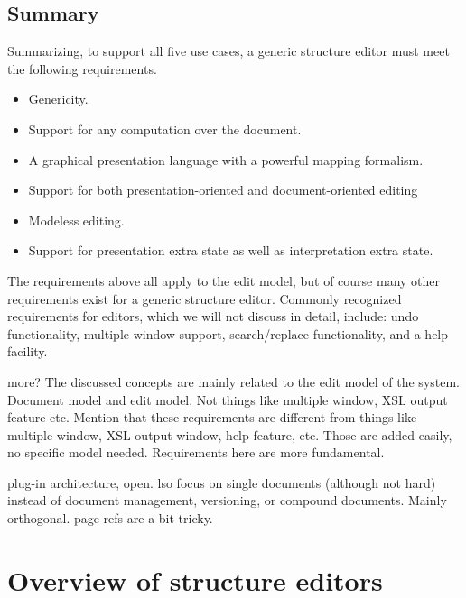 \documentclass{speauth}
\begin{document}
\subsection{Summary}

Summarizing, to support all five use cases, a generic structure editor must meet the following requirements.

\begin{itemize}
\item Genericity.
\item Support for any computation over the document.
\item A graphical presentation language with a powerful mapping formalism.
\item Support for both presentation-oriented and document-oriented editing %
\item Modeless editing.
\item Support for presentation extra state as well as interpretation extra state.
\end{itemize}

The requirements above all apply to the edit model, but of course many other requirements exist for a generic structure editor.  Commonly recognized requirements for editors, which we will not discuss in detail, include: undo functionality, multiple window support, search/replace functionality, and a help facility. 

\bc
more?
The discussed concepts are mainly related to the edit model of the system. 
Document model and edit model. Not things like multiple window, XSL output feature etc.
Mention that these requirements are different from things like multiple window, XSL output window, help feature, etc. Those are added easily, no specific model needed. Requirements here are more fundamental.

plug-in architecture, open.
lso focus on single documents (although not hard) 
instead of document management, versioning, or compound documents. Mainly orthogonal.
page refs are a bit tricky.
\ec

\section{Overview of structure editors} \label{sect:editorOverview}
\end{document}
